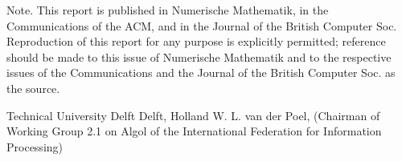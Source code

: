\documentclass[a4paper,11pt]{article}
\begin{document}
\vspace{4em}

Note.  This report is published in Numerische Mathematik, in the
Communications of the ACM, and in the Journal of the British Computer
Soc.  Reproduction of this report for any purpose is explicitly
permitted; reference should be made to this issue of Numerische
Mathematik and to the respective issues of the Communications and the
Journal of the British Computer Soc.  as the source.

\vspace{1em}

Technical University Delft\*
Delft, Holland\*
W. L. van der Poel,\*
(Chairman of Working Group 2.1 on Algol of the\*
International Federation for Information Processing)
\end{document}

